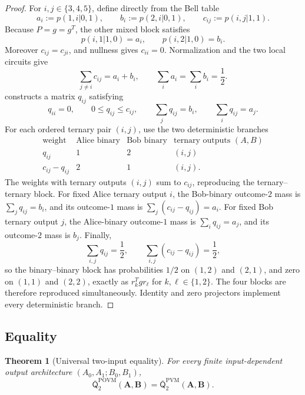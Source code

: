 \documentclass[11pt]{article}
\newtheorem{theorem}{Theorem}[section]
\theoremstyle{definition}
\newcommand{\Qbar}{\overline{\mathsf Q}}
\newcommand{\POVM}{\mathrm{POVM}}
\newcommand{\PVM}{\mathrm{PVM}}
\begin{document}
\begin{proof}
For \(i,j\in\{3,4,5\}\), define directly from the Bell table
\[
a_i:=p(1,i|0,1),\qquad b_i:=p(2,i|0,1),\qquad
c_{ij}:=p(i,j|1,1).
\]
Because \(P=g=g^T\), the other mixed block satisfies
\[
p(i,1|1,0)=a_i,\qquad p(i,2|1,0)=b_i.
\]
Moreover \(c_{ij}=c_{ji}\), and nullness gives \(c_{ii}=0\).
Normalization and the two local circuits give
\[
\sum_{j\ne i}c_{ij}=a_i+b_i,\qquad
\sum_i a_i=\sum_i b_i=\frac12.
\]
 constructs a matrix \(q_{ij}\) satisfying
\[
q_{ii}=0,\qquad 0\le q_{ij}\le c_{ij},\qquad
\sum_jq_{ij}=b_i,\qquad
\sum_iq_{ij}=a_j.
\]
For each ordered ternary pair \((i,j)\), use the two deterministic branches
\[
\begin{array}{c|c|c|c}
\text{weight}&\text{Alice binary}&\text{Bob binary}
&\text{ternary outputs }(A,B)\\
\hline
q_{ij}&1&2&(i,j)\\
c_{ij}-q_{ij}&2&1&(i,j).
\end{array}
\]
The weights with ternary outputs \((i,j)\) sum to \(c_{ij}\), reproducing the
ternary--ternary block. For fixed Alice ternary output \(i\), the Bob-binary
outcome-\(2\) mass is \(\sum_jq_{ij}=b_i\), and its outcome-\(1\) mass is
\(\sum_j(c_{ij}-q_{ij})=a_i\). For fixed Bob ternary output \(j\), the
Alice-binary outcome-\(1\) mass is \(\sum_iq_{ij}=a_j\), and its
outcome-\(2\) mass is \(b_j\). Finally,
\[
\sum_{i,j}q_{ij}=\frac12,\qquad
\sum_{i,j}(c_{ij}-q_{ij})=\frac12,
\]
so the binary--binary block has probabilities \(1/2\) on \((1,2)\) and
\((2,1)\), and zero on \((1,1)\) and \((2,2)\), exactly as
\(r_k^Tgr_\ell\) for \(k,\ell\in\{1,2\}\). The four blocks are therefore
reproduced simultaneously. Identity and zero projectors implement every
deterministic branch.
\end{proof}

\subsection{Equality}

\begin{theorem}[Universal two-input equality]
\label{thm:two-input-equality}
For every finite input-dependent output architecture
\((A_0,A_1;B_0,B_1)\),
\[
\boxed{
\Qbar^{\POVM}_2(\mathbf A,\mathbf B)
=
\Qbar^{\PVM}_2(\mathbf A,\mathbf B).
}
\]
\end{theorem}
\end{document}
